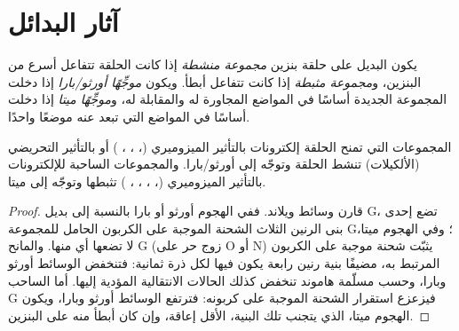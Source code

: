 \section{آثار البدائل}

\begin{definition}\label{def:b2:aromatic-substitution:directing}
يكون البديل على حلقة بنزين \emph{مجموعة منشطة} إذا كانت
الحلقة تتفاعل أسرع من البنزين، و\emph{مجموعة مثبطة} إذا كانت
تتفاعل أبطأ. ويكون \emph{موجِّهًا أورثو/بارا} إذا دخلت المجموعة
الجديدة أساسًا في المواضع المجاورة له والمقابلة له، و\emph{موجِّهًا
ميتا} إذا دخلت أساسًا في المواضع التي تبعد عنه موضعًا واحدًا.
\end{definition}

\begin{proposition}\label{prop:b2:aromatic-substitution:directing}
المجموعات التي تمنح الحلقة إلكترونات بالتأثير الميزوميري (، ، ،
) أو بالتأثير التحريضي  (الألكيلات) تنشط الحلقة وتوجّه
إلى أورثو/بارا. والمجموعات الساحبة للإلكترونات بالتأثير الميزوميري (، ، ،
، ) تثبطها وتوجّه إلى ميتا.
\end{proposition}

\begin{proof}
قارن وسائط ويلاند. ففي الهجوم أورثو أو بارا بالنسبة إلى بديل G، تضع إحدى
بنى الرنين الثلاث الشحنة الموجبة على الكربون الحامل للمجموعة G؛ وفي الهجوم ميتا،
لا تضعها أي منها. والمانح G (زوج حر على O أو N) يثبّت شحنة موجبة على الكربون المرتبط
به، مضيفًا بنية رنين رابعة يكون فيها لكل ذرة ثمانية: فتنخفض الوسائط أورثو
وبارا، وحسب مسلّمة هاموند تنخفض كذلك الحالات الانتقالية
المؤدية إليها. أما الساحب G فيزعزع استقرار الشحنة الموجبة على كربونه: فترتفع الوسائط أورثو وبارا،
ويكون الهجوم ميتا، الذي يتجنب تلك البنية، الأقل
إعاقة، وإن كان أبطأ منه على البنزين.
\end{proof}

